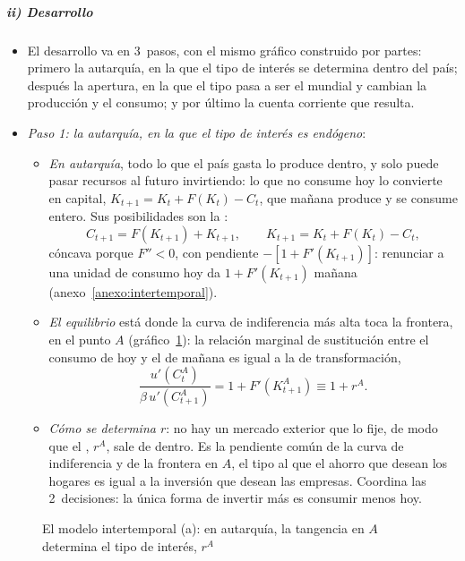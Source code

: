 \documentclass[11pt]{article}
\begin{document}
\subparagraph{ii) Desarrollo}

\begin{itemize}
\item El desarrollo va en 3~pasos, con el mismo gráfico construido por partes: primero la autarquía, en la que el tipo de interés se determina dentro del país; después la apertura, en la que el tipo pasa a ser el mundial y cambian la producción y el consumo; y por último la cuenta corriente que resulta.
\item \emph{Paso 1: la autarquía, en la que el tipo de interés es endógeno}:
  \begin{itemize}
  \item \emph{En autarquía}, todo lo que el país gasta lo produce dentro, y solo puede pasar recursos al futuro invirtiendo: lo que no consume hoy lo convierte en capital, $K_{t+1}=K_t+F(K_t)-C_t$, que mañana produce y se consume entero. Sus posibilidades son la :
    \begin{equation}\label{eq:fpp-intertemporal}
    C_{t+1}=F(K_{t+1})+K_{t+1},\qquad K_{t+1}=K_t+F(K_t)-C_t ,
    \end{equation}
    cóncava porque $F''<0$, con pendiente $-[1+F'(K_{t+1})]$: renunciar a una unidad de consumo hoy da $1+F'(K_{t+1})$ mañana (anexo~\ref{anexo:intertemporal}).
  \item \emph{El equilibrio} está donde la curva de indiferencia más alta toca la frontera, en el punto $A$ (gráfico~\ref{fig:cc-intertemporal-a}): la relación marginal de sustitución entre el consumo de hoy y el de mañana es igual a la de transformación,
    \[
    \frac{u'(C^A_t)}{\beta\,u'(C^A_{t+1})}=1+F'(K^A_{t+1})\equiv1+r^A .
    \]
  \item \emph{Cómo se determina $r$}: no hay un mercado exterior que lo fije, de modo que el , $r^A$, sale de dentro. Es la pendiente común de la curva de indiferencia y de la frontera en $A$, el tipo al que el ahorro que desean los hogares es igual a la inversión que desean las empresas. Coordina las 2~decisiones: la única forma de invertir más es consumir menos hoy.
  \end{itemize}
\end{itemize}

\begin{figure}[H]
\centering
\caption{El modelo intertemporal (a): en autarquía, la tangencia en $A$ determina el tipo de interés, $r^A$}\label{fig:cc-intertemporal-a}
\end{figure}
\end{document}
